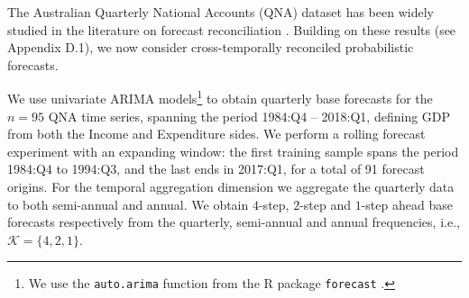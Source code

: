 \documentclass[a4paper,11pt]{article}
\theoremstyle{definition}
\begin{document}
The Australian Quarterly National Accounts (QNA) dataset has been widely studied in the literature on forecast reconciliation \citep{athanasopoulos2020, difonzo2023}. Building on these results (see Appendix D.1), we now consider cross-temporally reconciled probabilistic forecasts.

We use univariate ARIMA models\footnote{We use the \texttt{auto.arima} function from the R package \texttt{forecast} \citep{Rforecast}.} to obtain quarterly base forecasts for the $n = 95$ QNA time series, spanning the period 1984:Q4 -- 2018:Q1, defining GDP from both the Income and Expenditure sides. We perform a rolling forecast experiment with an expanding window: the first training sample spans the period 1984:Q4 to 1994:Q3, and the last ends in 2017:Q1, for a total of 91 forecast origins. For the temporal aggregation dimension we aggregate the quarterly data to both semi-annual and annual. We obtain $4$-step, $2$-step and $1$-step ahead base forecasts respectively from the quarterly, semi-annual and annual frequencies, i.e., $\mathcal{K} = \{4,2,1\}$.
\end{document}
